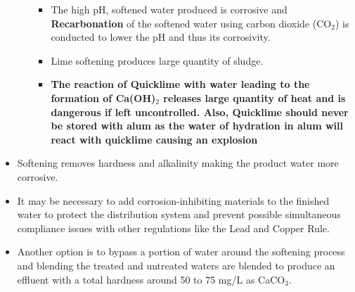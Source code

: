 \begin{itemize}
\begin{enumerate}
\begin{itemize}
\item The high pH, softened water produced is corrosive and \textbf{Recarbonation} of the softened water using carbon dioxide (CO$_2$) is conducted to lower the pH and thus its corrosivity.  
\item Lime softening produces large quantity of sludge.
\item \textbf{The reaction of Quicklime with water leading to the formation of Ca(OH)$_2$ releases large quantity of heat and is dangerous if left uncontrolled.  Also, Quicklime should never be stored with alum as the water of hydration in alum will react with quicklime causing an explosion}
\end{itemize}
\end{enumerate}
\item Softening removes hardness and alkalinity making the product water more corrosive.  
\item It may be necessary to add corrosion-inhibiting materials to the finished water to protect the distribution system and prevent possible simultaneous compliance issues with other regulations like the Lead and Copper Rule.
\item Another option is to bypass a portion of water around the softening process and blending the treated and untreated waters are blended to produce an effluent with a total hardness around 50 to 75 mg/L as CaCO$_3$. 
\end{itemize}
